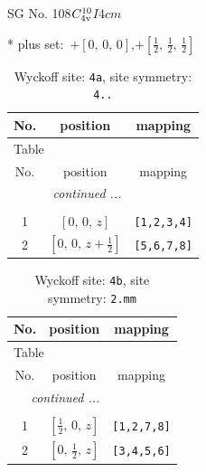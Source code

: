 \documentclass[fleqn,8pt]{jsarticle}
\begin{document}
\setcounter{MaxMatrixCols}{32}

\renewcommand{\tablename}{Table~}
\renewcommand{\figurename}{Figure~}
\begin{center}
\LARGE
SG No. 108\quad$C_{\rm 4v}^{10}$\quad$I4cm$\quad[ tetragonal ]
\end{center}
* plus set:\,\,\,$+\left[ 0,\, 0,\, 0 \right]$,\quad $+\left[ \frac{1}{2},\, \frac{1}{2},\, \frac{1}{2} \right]$
\renewcommand{\arraystretch}{1.2}
\begin{longtable}{ccc}
\caption{Wyckoff site: {\tt 4a}, site symmetry: {\tt 4..}}
 \\
 \hline \hline
No. & position & mapping \\ \hline \endfirsthead

\multicolumn{2}{l}{\tablename\ \thetable{}} \\
 \hline \hline
No. & position & mapping \\ \hline \endhead

 \hline \hline
\multicolumn{2}{r}{\footnotesize\it continued ...} \\ \endfoot

 \hline \hline
\multicolumn{2}{r}{} \\ \endlastfoot

1 & $\left[ 0,\, 0,\, z \right]$ & {\tt [1,2,3,4]} \\ \hline
2 & $\left[ 0,\, 0,\, z + \frac{1}{2} \right]$ & {\tt [5,6,7,8]} \\
\end{longtable}
\renewcommand{\arraystretch}{1.2}
\begin{longtable}{ccc}
\caption{Wyckoff site: {\tt 4b}, site symmetry: {\tt 2.mm}}
 \\
 \hline \hline
No. & position & mapping \\ \hline \endfirsthead

\multicolumn{2}{l}{\tablename\ \thetable{}} \\
 \hline \hline
No. & position & mapping \\ \hline \endhead

 \hline \hline
\multicolumn{2}{r}{\footnotesize\it continued ...} \\ \endfoot

 \hline \hline
\multicolumn{2}{r}{} \\ \endlastfoot

1 & $\left[ \frac{1}{2},\, 0,\, z \right]$ & {\tt [1,2,7,8]} \\ \hline
2 & $\left[ 0,\, \frac{1}{2},\, z \right]$ & {\tt [3,4,5,6]} \\
\end{longtable}
\end{document}
